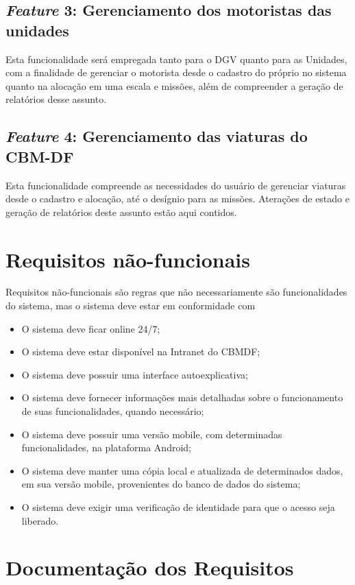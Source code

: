 \begin{apendicesenv}
		\subsection{\textit{Feature} 3: Gerenciamento dos motoristas das unidades}
Esta funcionalidade será empregada tanto para o DGV quanto para as Unidades, com a finalidade de gerenciar o motorista desde o cadastro do próprio no sistema quanto na alocação em uma escala e missões, além de compreender a geração de relatórios desse assunto.
		\subsection{\textit{Feature} 4: Gerenciamento das viaturas do CBM-DF}
Esta funcionalidade compreende as necessidades do usuário de gerenciar viaturas desde o cadastro e alocação, até o desígnio para as missões. Aterações de estado e geração de relatórios deste assunto estão aqui contidos.
	\section{Requisitos não-funcionais}		
Requisitos não-funcionais são regras que não necessariamente são funcionalidades do sistema, mas o sistema deve estar em conformidade com 
\begin{itemize}
 \item O sistema deve ficar online 24/7;
 \item O sistema deve estar disponível na Intranet do CBMDF;
 \item O sistema deve possuir uma interface autoexplicativa;
 \item O sistema deve fornecer informações mais detalhadas sobre o funcionamento de suas funcionalidades, quando necessário;
 \item O sistema deve possuir uma versão mobile, com determinadas funcionalidades, na plataforma Android;
 \item O sistema deve manter uma cópia local e atualizada de determinados dados, em sua versão mobile, provenientes do banco de dados do sistema;
 \item O sistema deve exigir uma verificação de identidade para que o acesso seja liberado.
\end{itemize}
	\section{Documentação dos Requisitos}

\end{apendicesenv}
